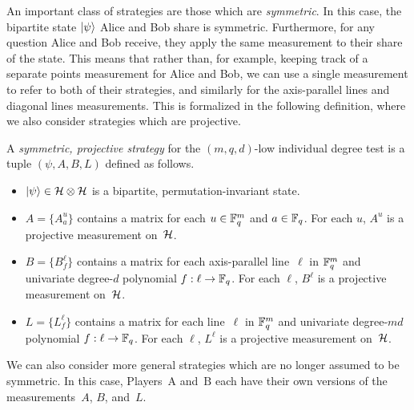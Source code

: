 An important class of strategies are those which are \emph{symmetric}.
In this case, the bipartite state $\ket{\psi}$ Alice and Bob share is symmetric.
Furthermore, for any question Alice and Bob receive, they apply the same measurement to their share of the state.
This means that rather than, for example, keeping track of a separate points measurement for Alice and Bob,
we can use a single measurement to refer to both of their strategies,
and similarly for the axis-parallel lines and diagonal lines measurements.
This is formalized in the following definition, where we also consider strategies which are projective.

\begin{definition}
A \emph{symmetric, projective strategy} for the $(m,q, d)$-low individual degree test
is a tuple $(\psi, A, B, L)$ defined as follows.
\begin{itemize}
\item[$\circ$] $\ket{\psi} \in \mathcal{H} \otimes \mathcal{H}$ is a bipartite, permutation-invariant state.
\item[$\circ$] $A = \{A^u_a\}$ contains a matrix for each $u \in \mathbb F_q^m$ and $a \in \mathbb F_q$.
			For each $u$, $A^u$ is a projective measurement on~$\mathcal{H}$.
\item[$\circ$] $B = \{B^{\ell}_f\}$ contains a matrix for each axis-parallel line~$\ell$ in $\mathbb F_q^m$
			and univariate degree-$d$ polynomial $f:\ell\rightarrow \mathbb F_q$.
			For each $\ell$, $B^{\ell}$ is a projective measurement on~$\mathcal{H}$.
\item[$\circ$] $L = \{L^{\ell}_f\}$ contains a matrix for each line~$\ell$ in $\mathbb F_q^m$
			and univariate degree-$md$ polynomial $f:\ell\rightarrow \mathbb F_q$.
			For each $\ell$, $L^{\ell}$ is a projective measurement on~$\mathcal{H}$.
\end{itemize}
\end{definition}

We can also consider more general strategies which are no longer assumed to be symmetric.
In this case, Players~$\mathrm{A}$ and~$\mathrm{B}$ each have their own versions of the measurements~$A$, $B$, and~$L$.

